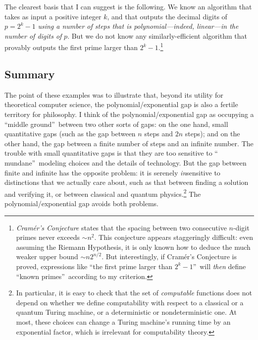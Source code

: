 \documentclass[12pt,onecolumn]{article}%
\begin{document}
The clearest basis that I can suggest is the following. We know an algorithm
that takes as input a positive integer $k$, and that outputs the decimal
digits of $p=2^{k}-1$ \textit{using a number of steps that is
polynomial---indeed, linear---in the number of digits of }$p$. But we do not
know any similarly-efficient algorithm that provably outputs the first prime
larger than $2^{k}-1$.\footnote{\textit{Cram\'{e}r's Conjecture} states that
the spacing between two consecutive $n$-digit primes never exceeds $\sim
n^{2}$. This conjecture appears staggeringly difficult: even assuming the
Riemann Hypothesis, it is only known how to deduce the much weaker upper bound
$\sim n2^{n/2}$. But interestingly, if Cram\'{e}r's Conjecture is proved,
expressions like \textquotedblleft the first prime larger than $2^{k}%
-1$\textquotedblright\  will \textit{then} define \textquotedblleft known
primes\textquotedblright\  according to my criterion.}

\subsection{Summary}

The point of these examples was to illustrate that, beyond its utility for
theoretical computer science, the polynomial/exponential gap is also a fertile
territory for philosophy. I think of the polynomial/exponential gap as
occupying a \textquotedblleft middle ground\textquotedblright\  between two
other sorts of gaps: on the one hand, small quantitative gaps (such as the gap
between $n$ steps and $2n$ steps); and on the other hand, the gap between a
finite number of steps and an infinite number. The trouble with small
quantitative gaps is that they are too sensitive to \textquotedblleft
mundane\textquotedblright\  modeling choices and the details of technology.
 But the gap between finite and infinite has the opposite problem: it is
serenely \textit{in}sensitive to distinctions that we actually care about,
such as that between finding a solution and verifying it, or between classical
and quantum physics.\footnote{In particular, it is easy to check that the set
of \textit{computable} functions does not depend on whether we define
computability with respect to a classical or a quantum Turing machine, or a
deterministic or nondeterministic one. At most, these choices can change a
Turing machine's running time by an exponential factor, which is irrelevant
for computability theory.} The polynomial/exponential gap avoids both problems.
\end{document}
